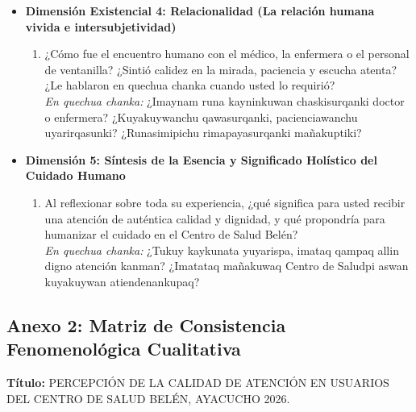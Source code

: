 \begin{itemize}
    \item \textbf{Dimensión Existencial 4: Relacionalidad (La relación humana vivida e intersubjetividad)}
    \begin{enumerate}[resume]
        \item ¿Cómo fue el encuentro humano con el médico, la enfermera o el personal de ventanilla? ¿Sintió calidez en la mirada, paciencia y escucha atenta? ¿Le hablaron en quechua chanka cuando usted lo requirió?\\
        \textit{En quechua chanka:} ¿Imaynam runa kayninkuwan chaskisurqanki doctor o enfermera? ¿Kuyakuywanchu qawasurqanki, pacienciawanchu uyarirqasunki? ¿Runasimipichu rimapayasurqanki mañakuptiki?
    \end{enumerate}

    \item \textbf{Dimensión 5: Síntesis de la Esencia y Significado Holístico del Cuidado Humano}
    \begin{enumerate}[resume]
        \item Al reflexionar sobre toda su experiencia, ¿qué significa para usted recibir una atención de auténtica calidad y dignidad, y qué propondría para humanizar el cuidado en el Centro de Salud Belén?\\
        \textit{En quechua chanka:} ¿Tukuy kaykunata yuyarispa, imataq qampaq allin digno atención kanman? ¿Imatataq mañakuwaq Centro de Saludpi aswan kuyakuywan atiendenankupaq?
    \end{enumerate}
\end{itemize}

\vspace{0.5cm}

\subsection*{Anexo 2: Matriz de Consistencia Fenomenológica Cualitativa}
\label{anx:2_matriz}

\noindent\textbf{Título:} PERCEPCIÓN DE LA CALIDAD DE ATENCIÓN EN USUARIOS DEL CENTRO DE SALUD BELÉN, AYACUCHO 2026.


